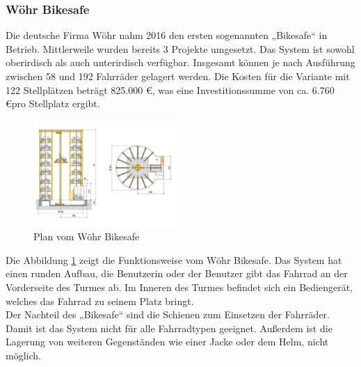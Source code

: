 \subsubsection{Wöhr Bikesafe}
Die deutsche Firma Wöhr nahm 2016 den ersten sogenannten „Bikesafe“ in Betrieb.  Mittlerweile wurden bereits 3 Projekte umgesetzt.  Das System ist sowohl oberirdisch als auch unterirdisch verfügbar. Insgesamt können je nach Ausführung zwischen 58 und 192 Fahrräder gelagert werden. Die Kosten für die Variante mit 122 Stellplätzen beträgt 825.000 \euro, was eine Investitionssumme von ca. 6.760 \euro pro Stellplatz ergibt.\cite*{richtpreisangebot} \\

\begin{figure}[H]
  \centering
  \includegraphics[width=0.5\textwidth]{images/bikesafe.png}
  \caption{Plan vom Wöhr Bikesafe }
  \label{fig:bikesafe}
\end{figure}

Die Abbildung \ref{fig:bikesafe} zeigt die Funktionsweise vom Wöhr Bikesafe. Das System hat einen runden Aufbau, die Benutzerin oder der Benutzer gibt das Fahrrad an der Vorderseite des Turmes ab. Im Inneren des Turmes befindet sich ein Bediengerät, welches das Fahrrad zu seinem Platz bringt.\\
Der Nachteil des „Bikesafe“ sind die Schienen zum Einsetzen der Fahrräder. Damit ist das System nicht für alle Fahrradtypen geeignet. Außerdem ist die Lagerung von weiteren Gegenständen wie einer Jacke oder dem Helm, nicht möglich.\\
